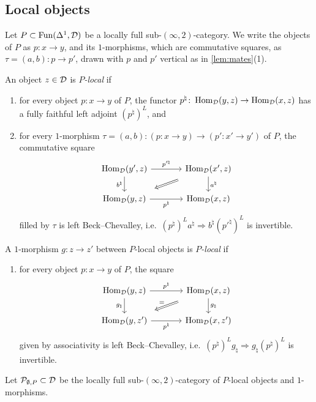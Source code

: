 \subsection{Local objects}
\label{subsec:laxloc-local}

%
Let
$P \subset \operatorname{Fun}(\Delta^{1},\mathcal{D})$
be a locally full sub-$(\infty,2)$-category. We write the objects of $P$ as
$p\colon x \to y$, and its $1$-morphisms, which are commutative squares, as
$\tau = (a,b)\colon p \to p'$,
drawn with $p$ and $p'$ vertical as in \cref{lem:mates}(1).

\begin{defi}
\label{def:laxloc-local}
%
An object $z \in \mathcal{D}$ is \emph{$P$-local} if
\begin{enumerate}
\item[(O1)] for every object $p\colon x \to y$ of $P$, the functor
$p^{\natural}\colon \operatorname{Hom}_{\mathcal{D}}(y,z) \to \operatorname{Hom}_{\mathcal{D}}(x,z)$
has a fully faithful left adjoint $(p^{\natural})^{L}$, and
\item[(O2)] for every $1$-morphism
$\tau = (a,b)\colon (p\colon x \to y) \to (p'\colon x' \to y')$
of $P$, the commutative square
\begin{equation*}
\begin{tikzcd}[column sep=large]
\Hom_{\D}(y',z) \ar[r, "p'^{\natural}"] \ar[d, "b^{\natural}"'] &
\Hom_{\D}(x',z) \ar[d, "a^{\natural}"] \ar[dl, Rightarrow, shorten=4mm] \\
\Hom_{\D}(y,z) \ar[r, "p^{\natural}"'] & \Hom_{\D}(x,z)
\end{tikzcd}
\end{equation*}
filled by $\tau$ is left Beck--Chevalley, i.e.\
$(p^{\natural})^{L}a^{\natural} \Rightarrow b^{\natural}(p'^{\natural})^{L}$
is invertible.
\end{enumerate}
A $1$-morphism $g\colon z \to z'$ between $P$-local objects is
\emph{$P$-local} if
\begin{enumerate}
\item[(M)] for every object $p\colon x \to y$ of $P$, the square
\begin{equation*}
\begin{tikzcd}[column sep=large]
\Hom_{\D}(y,z) \ar[r, "p^{\natural}"] \ar[d, "g_{\natural}"'] &
\Hom_{\D}(x,z) \ar[d, "g_{\natural}"] \ar[dl, Rightarrow, shorten=4mm, "="'] \\
\Hom_{\D}(y,z') \ar[r, "p^{\natural}"'] & \Hom_{\D}(x,z')
\end{tikzcd}
\end{equation*}
given by associativity is left Beck--Chevalley, i.e.\
$(p^{\natural})^{L}g_{\natural} \Rightarrow g_{\natural}(p^{\natural})^{L}$
is invertible.
\end{enumerate}
Let
$\mathcal{P}_{\emptyset,P} \subset \mathcal{D}$
be the locally full sub-$(\infty,2)$-category of $P$-local objects and
$1$-morphisms.
\end{defi}

